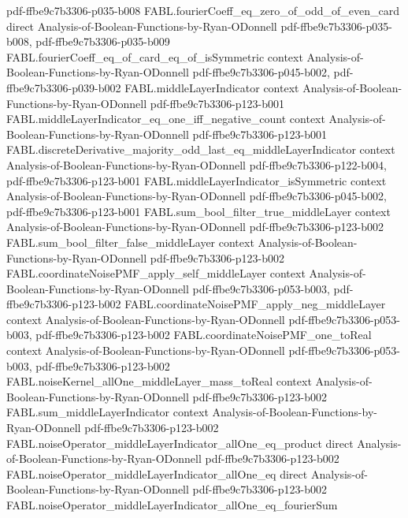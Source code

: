\begin{theorem}
  {pdf-ffbe9c7b3306-p035-b008}
\proofstep
  {FABL.fourierCoeff_eq_zero_of_odd_of_even_card}
  {direct}
  {Analysis-of-Boolean-Functions-by-Ryan-ODonnell}
  {pdf-ffbe9c7b3306-p035-b008,
    pdf-ffbe9c7b3306-p035-b009}
\proofstep
  {FABL.fourierCoeff_eq_of_card_eq_of_isSymmetric}
  {context}
  {Analysis-of-Boolean-Functions-by-Ryan-ODonnell}
  {pdf-ffbe9c7b3306-p045-b002,
    pdf-ffbe9c7b3306-p039-b002}
\proofstep
  {FABL.middleLayerIndicator}
  {context}
  {Analysis-of-Boolean-Functions-by-Ryan-ODonnell}
  {pdf-ffbe9c7b3306-p123-b001}
\proofstep
  {FABL.middleLayerIndicator_eq_one_iff_negative_count}
  {context}
  {Analysis-of-Boolean-Functions-by-Ryan-ODonnell}
  {pdf-ffbe9c7b3306-p123-b001}
\proofstep
  {FABL.discreteDerivative_majority_odd_last_eq_middleLayerIndicator}
  {context}
  {Analysis-of-Boolean-Functions-by-Ryan-ODonnell}
  {pdf-ffbe9c7b3306-p122-b004,
    pdf-ffbe9c7b3306-p123-b001}
\proofstep
  {FABL.middleLayerIndicator_isSymmetric}
  {context}
  {Analysis-of-Boolean-Functions-by-Ryan-ODonnell}
  {pdf-ffbe9c7b3306-p045-b002,
    pdf-ffbe9c7b3306-p123-b001}
\proofstep
  {FABL.sum_bool_filter_true_middleLayer}
  {context}
  {Analysis-of-Boolean-Functions-by-Ryan-ODonnell}
  {pdf-ffbe9c7b3306-p123-b002}
\proofstep
  {FABL.sum_bool_filter_false_middleLayer}
  {context}
  {Analysis-of-Boolean-Functions-by-Ryan-ODonnell}
  {pdf-ffbe9c7b3306-p123-b002}
\proofstep
  {FABL.coordinateNoisePMF_apply_self_middleLayer}
  {context}
  {Analysis-of-Boolean-Functions-by-Ryan-ODonnell}
  {pdf-ffbe9c7b3306-p053-b003,
    pdf-ffbe9c7b3306-p123-b002}
\proofstep
  {FABL.coordinateNoisePMF_apply_neg_middleLayer}
  {context}
  {Analysis-of-Boolean-Functions-by-Ryan-ODonnell}
  {pdf-ffbe9c7b3306-p053-b003,
    pdf-ffbe9c7b3306-p123-b002}
\proofstep
  {FABL.coordinateNoisePMF_one_toReal}
  {context}
  {Analysis-of-Boolean-Functions-by-Ryan-ODonnell}
  {pdf-ffbe9c7b3306-p053-b003,
    pdf-ffbe9c7b3306-p123-b002}
\proofstep
  {FABL.noiseKernel_allOne_middleLayer_mass_toReal}
  {context}
  {Analysis-of-Boolean-Functions-by-Ryan-ODonnell}
  {pdf-ffbe9c7b3306-p123-b002}
\proofstep
  {FABL.sum_middleLayerIndicator}
  {context}
  {Analysis-of-Boolean-Functions-by-Ryan-ODonnell}
  {pdf-ffbe9c7b3306-p123-b002}
\proofstep
  {FABL.noiseOperator_middleLayerIndicator_allOne_eq_product}
  {direct}
  {Analysis-of-Boolean-Functions-by-Ryan-ODonnell}
  {pdf-ffbe9c7b3306-p123-b002}
\proofstep
  {FABL.noiseOperator_middleLayerIndicator_allOne_eq}
  {direct}
  {Analysis-of-Boolean-Functions-by-Ryan-ODonnell}
  {pdf-ffbe9c7b3306-p123-b002}
\proofstep
  {FABL.noiseOperator_middleLayerIndicator_allOne_eq_fourierSum}

\end{theorem}
